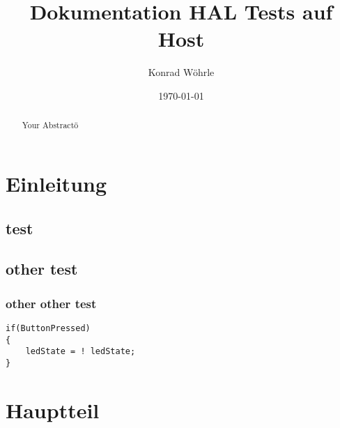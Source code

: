 \documentclass[12pt,a4paper]{article}
\title{Dokumentation HAL Tests auf Host}
\author{Konrad Wöhrle}
\date{\today}
\begin{document}
\maketitle
\tableofcontents
\newpage

\section{Einleitung}

\subsection{test}
\subsection{other test}
\subsubsection{other other test}

\begin{verbatim}
if(ButtonPressed)
{
    ledState = ! ledState;
}
\end{verbatim}

\section{Hauptteil}

\section{}

\begin{abstract}
Your Abstractö
\end{abstract}
\end{document}
